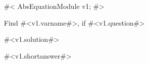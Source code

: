 

#<
AbsEquationModule v1;
#>


Find #<v1.varname#>, if #<v1.question#>



#<v1.solution#>



#<v1.shortanswer#>



